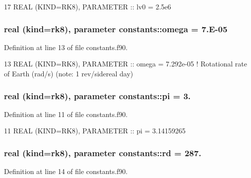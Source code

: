 \begin{DoxyCode}
17 \textcolor{keywordtype}{REAL (KIND=RK8)}, \textcolor{keywordtype}{PARAMETER}  :: lv0      = 2.5e6
\end{DoxyCode}
\subsubsection[{\texorpdfstring{omega}{omega}}]{\setlength{\rightskip}{0pt plus 5cm}real (kind=rk8), parameter constants\+::omega = 7.\+E-\/05}\hypertarget{namespaceconstants_a67051296d7b4bcd0d4cee08bba6e46fa}{}\label{namespaceconstants_a67051296d7b4bcd0d4cee08bba6e46fa}


Definition at line 13 of file constants.\+f90.


\begin{DoxyCode}
13 \textcolor{keywordtype}{REAL (KIND=RK8)}, \textcolor{keywordtype}{PARAMETER}  :: omega    = 7.292e-05         \textcolor{comment}{! Rotational rate of Earth (rad/s) (note: 1
       rev/sidereal day)}
\end{DoxyCode}
\subsubsection[{\texorpdfstring{pi}{pi}}]{\setlength{\rightskip}{0pt plus 5cm}real (kind=rk8), parameter constants\+::pi = 3.}\hypertarget{namespaceconstants_a064bd715409f723a4e6d45b6300c5ca0}{}\label{namespaceconstants_a064bd715409f723a4e6d45b6300c5ca0}


Definition at line 11 of file constants.\+f90.


\begin{DoxyCode}
11 \textcolor{keywordtype}{REAL (KIND=RK8)}, \textcolor{keywordtype}{PARAMETER}  :: pi       = 3.14159265
\end{DoxyCode}
\subsubsection[{\texorpdfstring{rd}{rd}}]{\setlength{\rightskip}{0pt plus 5cm}real (kind=rk8), parameter constants\+::rd = 287.}\hypertarget{namespaceconstants_ad91564da82b97ea0d29ce0565565db85}{}\label{namespaceconstants_ad91564da82b97ea0d29ce0565565db85}


Definition at line 14 of file constants.\+f90.


